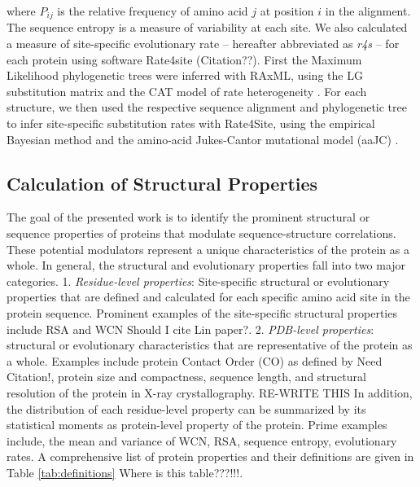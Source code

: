 \documentclass[12pt]{article}
\begin{document}
    where $P_{ij}$ is the relative frequency of amino acid $j$ at position $i$ in the alignment. The sequence entropy is a measure of variability at each site. We also calculated a measure of site-specific evolutionary rate -- hereafter abbreviated as {\it r4s} -- for each protein using software Rate4site {\color{red}(Citation??)}. First the Maximum Likelihood phylogenetic trees were inferred with RAxML, using the LG substitution matrix and the CAT model of rate heterogeneity \citep{Stamatakis2006, Stamatakis2014}. For each structure, we then used the respective sequence alignment and phylogenetic tree to infer site-specific substitution rates with Rate4Site, using the empirical Bayesian method and the amino-acid Jukes-Cantor mutational model (aaJC) \citep{Mayroseetal2004}.

    \subsection*{Calculation of Structural Properties}
    The goal of the presented work is to identify the prominent structural or sequence properties of proteins that modulate sequence-structure correlations. These potential modulators represent a unique characteristics of the protein as a whole.  In general, the structural and evolutionary properties fall into two major categories.  1. {\it Residue-level properties}: Site-specific structural or evolutionary properties that are defined and calculated for each specific amino acid site in the protein sequence. Prominent examples of the site-specific structural properties include RSA \citep{Fransozaetal2009, Scherreretal2012, Yehetal2014}  and WCN \citep{Shihetal2012, Yehetal2014} {\color{red}Should I cite Lin paper?}.   2. {\it PDB-level properties}: structural or evolutionary characteristics that are representative of the protein as a whole. Examples include protein Contact Order (CO) as defined by {\color{red}Need Citation!}, protein size and compactness, sequence length, and structural resolution of the protein in X-ray crystallography. {\color{blue} RE-WRITE THIS In addition, the distribution of each residue-level property can be summarized by its statistical moments as protein-level property of the protein}. Prime examples include, the mean and variance of WCN, RSA, sequence entropy, evolutionary rates. A comprehensive list of protein properties and their definitions are given in Table 
 \ref{tab:definitions} {\color{red} Where is this table???!!!}. \\
\end{document}
